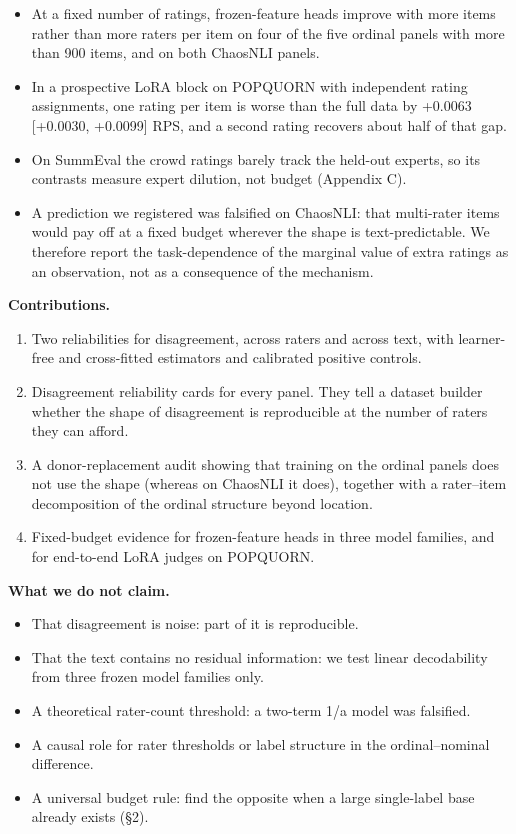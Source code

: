 \documentclass{article}
\providecommand{\tightlist}{\setlength{\itemsep}{0pt}\setlength{\parskip}{0pt}}
\begin{document}
\begin{itemize}
\tightlist
\item
  At a fixed number of ratings, frozen-feature heads improve with more items rather than more raters per item on four of the five ordinal panels with more than 900 items, and on both ChaosNLI panels.
\item
  In a prospective LoRA block on POPQUORN with independent rating assignments, one rating per item is worse than the full data by +0.0063 {[}+0.0030, +0.0099{]} RPS, and a second rating recovers about half of that gap.
\item
  On SummEval the crowd ratings barely track the held-out experts, so its contrasts measure expert dilution, not budget (Appendix C).
\item
  A prediction we registered was falsified on ChaosNLI: that multi-rater items would pay off at a fixed budget wherever the shape is text-predictable. We therefore report the task-dependence of the marginal value of extra ratings as an observation, not as a consequence of the mechanism.
\end{itemize}

\textbf{Contributions.}

\begin{enumerate}
\def\labelenumi{\arabic{enumi}.}
\tightlist
\item
  Two reliabilities for disagreement, across raters and across text, with learner-free and cross-fitted estimators and calibrated positive controls.
\item
  Disagreement reliability cards for every panel. They tell a dataset builder whether the shape of disagreement is reproducible at the number of raters they can afford.
\item
  A donor-replacement audit showing that training on the ordinal panels does not use the shape (whereas on ChaosNLI it does), together with a rater--item decomposition of the ordinal structure beyond location.
\item
  Fixed-budget evidence for frozen-feature heads in three model families, and for end-to-end LoRA judges on POPQUORN.
\end{enumerate}

\textbf{What we do not claim.}

\begin{itemize}
\tightlist
\item
  That disagreement is noise: part of it is reproducible.
\item
  That the text contains no residual information: we test linear decodability from three frozen model families only.
\item
  A theoretical rater-count threshold: a two-term 1/a model was falsified.
\item
  A causal role for rater thresholds or label structure in the ordinal--nominal difference.
\item
  A universal budget rule: \citet{zhang2021learning} find the opposite when a large single-label base already exists (\S{}2).
\end{itemize}
\end{document}
